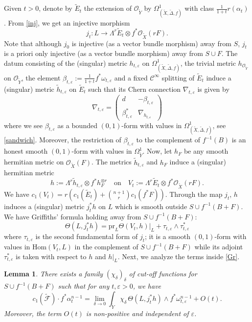 \documentclass[12pt]{amsart}
\newtheorem{lem}[prop]{Lemma}
\theoremstyle{definition}
\newcommand{\tX}{\widetilde{X}}
\newcommand{\tY}{\widetilde{Y}}
\newcommand{\tE}{\widetilde{E}}
\newcommand{\cO}{\mathcal{O}}
\numberwithin{equation}{section}
\newcommand{\tF}{\widetilde{\mathcal{F}}}
\newcommand{\tDe}{\widetilde \Delta}
\newcommand{\ep}{\varepsilon}
\begin{document}
 Given $t>0$, denote by $\tE_t$ the extension of $\cO_{\tY}$ by $\Omega^1_{(\tX,\tDe, f)}$ with class $\frac{1}{1+t}r(\alpha_t)$.  From \eqref{inj}, we get an injective morphism 
 \begin{equation}
 \label{inj2}
 j_t:L\to \Lambda^r \tE_t \otimes f^*\cO_{\tX}(rF).
 \end{equation}
 Note that although $j_0$ is injective (as a vector bundle morphism) away from $S$, $j_t$ is a priori only injective (as a vector bundle morphism) away from $S\cup F$.  The datum consisting of the (singular) metric $h_{t,\ep}$ on $\Omega_{(\tX, \tDe, f)}^1$, the trivial metric $h_{\cO_{\tY}}$ on $\cO_{\tY}$, the element $\beta_{t,\ep}:=\frac{1}{1+t}f^*\omega_{t,\ep}$ and a fixed $\mathcal C^\infty$ splitting of $\tE_t$ induce a (singular) metric $\tilde h_{t,\ep}$ on $\tE_t$ such that its Chern connection $\nabla_{t,\ep}$ is given by
 \[\nabla_{t,\ep}=
 \begin{pmatrix}
 d & -\beta_{t,\ep}\\
 \beta_{t,\ep}^* & \nabla_{h_{t,\ep}}
 \end{pmatrix}
 \]
where we see $\beta_{t,\ep}$ as a bounded $(0,1)$-form with values in $\Omega_{(\tX, \tDe, f)}^1$, see \eqref{sandwich}. Moreover, the restriction of $\beta_{t,\ep}$ to the complement of $f^{-1}(B)$ is an honest smooth $(0,1)$-form with values in $\Omega_{\tY}^1$. Now, let $h_F$ be any smooth hermitian metric on $\cO_{\tX}(F)$. The metrics $\tilde h_{t,\ep}$ and $h_F$ induce a (singular) hermitian metric 
\begin{equation}
\label{Vt}
h:=\Lambda^r \tilde h_{t,\ep} \otimes f^*h_F^{\otimes r} \quad \mbox{on} \quad V_t:=\Lambda^r \tE_t \otimes f^*\cO_{\tX}(rF).
\end{equation}
We have $c_1(V_t)=r(c_1(\tE_t)+{n+1 \choose r} c_1(f^*F))$. Through the map $j_t$, $h$ induces a (singular) metric $j_t^*h$ on $L$ which is smooth outside $S\cup f^{-1}(B+F)$. 
We have Griffiths' formula holding away from $S\cup f^{-1}(B+F)$:
\begin{equation}
\label{Gr}
\Theta(L, j_t^*h)=\mathrm{pr}_L \Theta(V_t, h)|_L+\tau_{t,\ep}\wedge \tau_{t,\ep}^*
\end{equation}
where $\tau_{t,\ep}$ is the second fundamental form of $j_t$; it is a smooth $(0,1)$-form with values in $\mathrm{Hom}(V_t,L)$ in the complement of $S\cup f^{-1}(B+F)$ while its adjoint $\tau_{t,\ep}^*$ is taken with respect to $h$ and $h|_L$. 
Next, we analyze the terms inside \eqref{Gr}. 

\begin{lem}
\label{lem1}
There exists a family $(\chi_\delta)_\delta$ of cut-off functions for $S\cup f^{-1}(B+F)$ such that for any $t,\ep>0$, we have
\[c_1(\tF) \cdot f^*\alpha_t^{n-1}= \lim_{\delta \to 0} \int_{\tY} \chi_\delta \, \Theta(L, j_t^*h) \wedge f^*\omega_{t,\ep}^{n-1}+O(t).\]
Moreover, the term $O(t)$ is non-positive and independent of $\ep$.
\end{lem}
\end{document}

